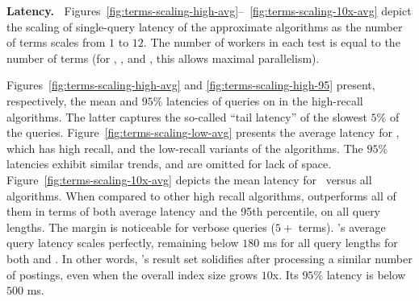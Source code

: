 {{{\bf Latency.\ } 
Figures~\ref{fig:terms-scaling-high-avg}--~\ref{fig:terms-scaling-10x-avg} depict the scaling of single-query latency of the approximate algorithms  
as the number of terms scales from $1$ to $12$. The number of workers in each test 
is equal to the number of terms (for \alg, \pRA, and \pNRA, this allows maximal parallelism). 

Figures~\ref{fig:terms-scaling-high-avg} and \ref{fig:terms-scaling-high-95} present, respectively, the  mean and  
$95\%$ latencies of queries  on  {\cw} in the high-recall algorithms. The latter captures the so-called ``tail latency'' of 
the slowest $5\%$ of the queries. Figure~\ref{fig:terms-scaling-low-avg} presents the average latency for \alg, which has high recall, and the low-recall variants of the algorithms.
The $95\%$ latencies exhibit similar trends, and are omitted for lack of space.
%
Figure~\ref{fig:terms-scaling-10x-avg} depicts the mean latency for \cwten\ versus all algorithms.
%
When compared to other high recall algorithms, \alg\/ outperforms all of them in terms of both average latency and the 95th percentile, on all query lengths.
The margin is noticeable for verbose queries
($5+$ terms). \alg's average query latency scales perfectly, 
remaining below $180$ ms for all query lengths
 for both \cw\/ and \cwten.  
In other words, \alg's result set solidifies after processing 
a similar number of postings, 
 even when the overall index size grows $10$x. 
Its  $95\%$ latency is below $500$ ms. 


\begin{figure}[tbh]


\end{figure}}}
